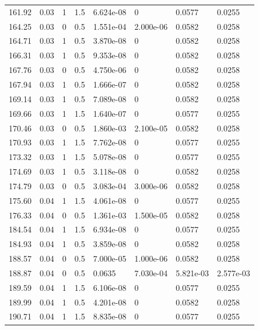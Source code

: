 \documentclass[preview]{standalone}
\begin{document}
{{{\begin{tabular}{L{1.2cm}C{1.2cm} C{0.3cm}C{0.5cm} C{1.4cm}C{1.4cm} C{1.4cm}C{1.4cm}}
  161.92  &  0.03  & 1     & 1.5 &  6.624e-08  & 0  & 0.0577 &  0.0255   \\ 
  164.25  &  0.03  & 0     & 0.5 &  1.551e-04  & 2.000e-06  & 0.0582 &  0.0258   \\ 
  164.71  &  0.03  & 1     & 0.5 &  3.870e-08  & 0  & 0.0582 &  0.0258   \\ 
  166.31  &  0.03  & 1     & 0.5 &  9.353e-08  & 0  & 0.0582 &  0.0258   \\ 
  167.76  &  0.03  & 0     & 0.5 &  4.750e-06  & 0  & 0.0582 &  0.0258   \\ 
  167.94  &  0.03  & 1     & 0.5 &  1.666e-07  & 0  & 0.0582 &  0.0258   \\ 
  169.14  &  0.03  & 1     & 0.5 &  7.089e-08  & 0  & 0.0582 &  0.0258   \\ 
  169.66  &  0.03  & 1     & 1.5 &  1.640e-07  & 0  & 0.0577 &  0.0255   \\ 
  170.46  &  0.03  & 0     & 0.5 &  1.860e-03  & 2.100e-05  & 0.0582 &  0.0258   \\ 
  170.93  &  0.03  & 1     & 1.5 &  7.762e-08  & 0  & 0.0577 &  0.0255   \\ 
  173.32  &  0.03  & 1     & 1.5 &  5.078e-08  & 0  & 0.0577 &  0.0255   \\ 
  174.69  &  0.03  & 1     & 0.5 &  3.118e-08  & 0  & 0.0582 &  0.0258   \\ 
  174.79  &  0.03  & 0     & 0.5 &  3.083e-04  & 3.000e-06  & 0.0582 &  0.0258   \\ 
  175.60  &  0.04  & 1     & 1.5 &  4.061e-08  & 0  & 0.0577 &  0.0255   \\ 
  176.33  &  0.04  & 0     & 0.5 &  1.361e-03  & 1.500e-05  & 0.0582 &  0.0258   \\ 
  184.54  &  0.04  & 1     & 1.5 &  6.934e-08  & 0  & 0.0577 &  0.0255   \\ 
  184.93  &  0.04  & 1     & 0.5 &  3.859e-08  & 0  & 0.0582 &  0.0258   \\ 
  188.57  &  0.04  & 0     & 0.5 &  7.000e-05  & 1.000e-06  & 0.0582 &  0.0258   \\ 
  188.87  &  0.04  & 0     & 0.5 &  0.0635  & 7.030e-04  & 5.821e-03 &  2.577e-03   \\ 
  189.59  &  0.04  & 1     & 1.5 &  6.106e-08  & 0  & 0.0577 &  0.0255   \\ 
  189.99  &  0.04  & 1     & 0.5 &  4.201e-08  & 0  & 0.0582 &  0.0258   \\ 
  190.71  &  0.04  & 1     & 1.5 &  8.835e-08  & 0  & 0.0577 &  0.0255   \\ 

\end{tabular}}}}
\end{document}

